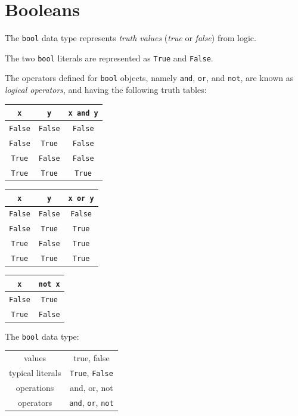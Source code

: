 \documentclass[8pt,a4paper,compress,handout]{beamer}
\begin{document}
\section{Booleans}
\begin{frame}[fragile]
The \lstinline{bool} data type represents \emph{truth values} (\emph{true} or \emph{false}) from logic. 

\bigskip

The two \lstinline{bool} literals are represented as \lstinline{True} and \lstinline{False}.

\bigskip

The operators defined for \lstinline{bool} objects, namely \lstinline{and}, \lstinline{or}, and \lstinline{not}, are known as \emph{logical operators}, and having the following truth tables:

\begin{center}
\begin{tabular}{cc|c}
\lstinline$x$ & \lstinline$y$ & \lstinline$x and y$ \\ \hline
\lstinline$False$ & \lstinline$False$ & \lstinline$False$ \\
\lstinline$False$ & \lstinline$True$ & \lstinline$False$ \\
\lstinline$True$ & \lstinline$False$ & \lstinline$False$ \\
\lstinline$True$ & \lstinline$True$ & \lstinline$True$
\end{tabular}\hspace{1cm} \begin{tabular}{cc|c}
\lstinline$x$ & \lstinline$y$ & \lstinline$x or y$ \\ \hline
\lstinline$False$ & \lstinline$False$ & \lstinline$False$ \\
\lstinline$False$ & \lstinline$True$ & \lstinline$True$ \\
\lstinline$True$ & \lstinline$False$ & \lstinline$True$ \\
\lstinline$True$ & \lstinline$True$ & \lstinline$True$
\end{tabular}\hspace{1cm} \begin{tabular}{c|c}
\lstinline$x$ & \lstinline$not x$ \\ \hline
\lstinline$False$ & \lstinline$True$ \\
\lstinline$True$ & \lstinline$False$
\end{tabular}
\end{center}

\bigskip

The \lstinline{bool} data type:

\begin{center}
\begin{tabular}{c|c}
values & true, false \\ 
typical literals & \lstinline$True$, \lstinline$False$ \\ 
operations & and, or, not \\
operators & \lstinline$and$, \lstinline$or$, \lstinline$not$
\end{tabular} 
\end{center}
\end{frame}
\end{document}
